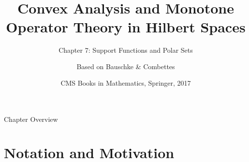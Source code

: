 \documentclass[aspectratio=169,10pt]{beamer}
\title[Convex Analysis \& MOT -- Ch.7]{Convex Analysis and Monotone Operator Theory in Hilbert Spaces}
\subtitle{Chapter 7: Support Functions and Polar Sets}
\author{Based on Bauschke \& Combettes}
\date{CMS Books in Mathematics, Springer, 2017}
\begin{document}
\begin{frame}
  \titlepage
\end{frame}

\begin{frame}{Chapter Overview}
  \tableofcontents
\end{frame}


\section{Notation and Motivation}
\end{document}
